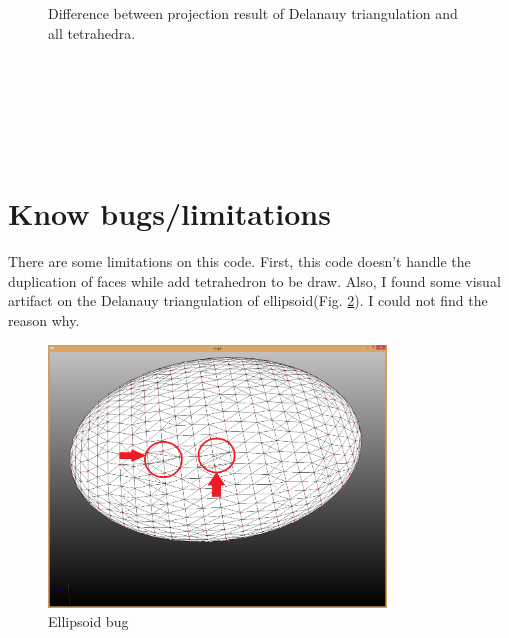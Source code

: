 \documentclass[11pt]{article}
\begin{document}
\begin{figure}[h]
 \centering
  \hspace{-3mm}
  \hspace{-3mm}
  \caption{Difference between projection result of Delanauy triangulation and all tetrahedra.\label{fig:T}}
\end{figure}
\\\\\\\\\\
\section{Know bugs/limitations}
There are some limitations on this code. First, this code doesn't handle the duplication of faces while add tetrahedron to be draw. Also, I found some visual artifact on the Delanauy triangulation of ellipsoid(Fig. \ref{fig:Ellipsoid}). I could not find the reason why.
\begin{figure}[htb]
  \begin{center}
  \includegraphics[width=0.8\textwidth]{img/ellipsoid1_bug.png}
  \caption{Ellipsoid bug}
  \label{fig:Ellipsoid}
  \end{center}
\end{figure}


\end{document}
